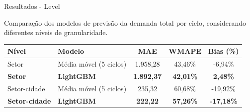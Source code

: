 \documentclass[aspectratio=169,11pt]{beamer}
\begin{document}
\begin{frame}{Resultados - Level}
    \small

    Comparação dos modelos de previsão da demanda
    total por ciclo, considerando diferentes níveis
    de granularidade.

    \vspace{0.5cm}

    \begin{table}
        \centering
        \footnotesize
        \renewcommand{\arraystretch}{1.5}

        \begin{tabular}{llccc}
            \toprule
            \textbf{Nível} &
            \textbf{Modelo} &
            \textbf{MAE} &
            \textbf{WMAPE} &
            \textbf{Bias (\%)} \\
            \midrule

            Setor &
            Média móvel (5 ciclos) &
            1.958,28 &
            43,46\% &
            -6,94\% \\

            \textbf{Setor} &
            \textbf{LightGBM} &
            \textbf{1.892,37} &
            \textbf{42,01\%} &
            \textbf{2,48\%} \\

            \midrule

            Setor-cidade &
            Média móvel (5 ciclos) &
            235,32 &
            60,68\% &
            -19,92\% \\

            \textbf{Setor-cidade} &
            \textbf{LightGBM} &
            \textbf{222,22} &
            \textbf{57,26\%} &
            \textbf{-17,18\%} \\

            \bottomrule
        \end{tabular}
    \end{table}

\end{frame}
\end{document}
